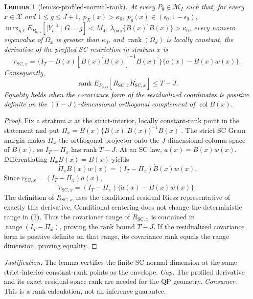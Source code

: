\documentclass{article}
\newtheorem{lemma}{Lemma}
\begin{document}
\begin{lemma}[lem:sc-profiled-normal-rank]\label{lem:sc-profiled-normal-rank}
At every \(P_0\in\mathcal M_I\) such that, for every \(x\in\mathcal X\) and \(1\le g\le J+1\), \(p_X(x)>\kappa_0\), \(p_g(x)\in(\epsilon_0,1-\epsilon_0)\), \(\max_{g,t}E_{P_{0,O}}[|Y_t|^4\mid G=g]<M_4\), \(\lambda_{\min}\{B(x)^{\prime}B(x)\}>\kappa_0\), every nonzero eigenvalue of \(\Omega_x\) is greater than \(\kappa_0\), and \(\operatorname{rank}(\Omega_x)\) is locally constant, the derivative of the profiled SC restriction in stratum \(x\) is \[\dot r_{\mathrm{SC},x}=\{I_T-B(x)[B(x)^{\prime}B(x)]^{-1}B(x)^{\prime}\}\{\dot a(x)-\dot B(x)w(x)\}.\] Consequently, \[\operatorname{rank}E_{P_{0,O}}[R_{\mathrm{SC},x}R_{\mathrm{SC},x}^{\prime}]\le T-J.\] Equality holds when the covariance form of the residualized coordinates is positive definite on the \((T-J)\)-dimensional orthogonal complement of \(\operatorname{col}B(x)\).
\end{lemma}
\begin{proof}
Fix a stratum \(x\) at the strict-interior, locally constant-rank point in the statement and put \(\Pi_x=B(x)\{B(x)^{\prime}B(x)\}^{-1}B(x)^{\prime}\).  The strict SC Gram margin makes \(\Pi_x\) the orthogonal projector onto the \(J\)-dimensional column space of \(B(x)\), so \(I_T-\Pi_x\) has rank \(T-J\).  At an SC law, \(a(x)=B(x)w(x)\).  Differentiating \(\Pi_xB(x)=B(x)\) yields
\[
 \dot\Pi_xB(x)w(x)=(I_T-\Pi_x)\dot B(x)w(x).
 \tag{1}
\]
Since \(r_{\mathrm{SC},x}=(I_T-\Pi_x)a(x)\),
\[
 \dot r_{\mathrm{SC},x}
 =(I_T-\Pi_x)\{\dot a(x)-\dot B(x)w(x)\}.
 \tag{2}
\]
The definition of \(R_{\mathrm{SC},x}\) uses the conditional-residual Riesz representative of exactly this derivative.  Conditional centering does not change the deterministic range in (2).  Thus the covariance range of \(R_{\mathrm{SC},x}\) is contained in \(\operatorname{range}(I_T-\Pi_x)\), proving the rank bound \(T-J\).  If the residualized covariance form is positive definite on that range, its covariance rank equals the range dimension, proving equality.
\end{proof}
\par\smallskip\noindent \textit{Justification.} The lemma certifies the finite SC normal dimension at the same strict-interior constant-rank points as the envelope. \textit{Gap.} The profiled derivative and its exact residual-space rank are needed for the QP geometry. \textit{Consumer.} This is a rank calculation, not an inference guarantee.
\end{document}
